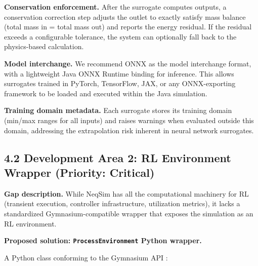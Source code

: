 \documentclass[review,3p]{custom}
\begin{document}
\textbf{Conservation enforcement.} After the surrogate computes outputs, a conservation correction step adjusts the outlet to exactly satisfy mass balance (total mass in = total mass out) and reports the energy residual. If the residual exceeds a configurable tolerance, the system can optionally fall back to the physics-based calculation.

\textbf{Model interchange.} We recommend ONNX \cite{ONNX2019} as the model interchange format, with a lightweight Java ONNX Runtime binding for inference. This allows surrogates trained in PyTorch, TensorFlow, JAX, or any ONNX-exporting framework to be loaded and executed within the Java simulation.

\textbf{Training domain metadata.} Each surrogate stores its training domain (min/max ranges for all inputs) and raises warnings when evaluated outside this domain, addressing the extrapolation risk inherent in neural network surrogates.

\subsection{4.2 Development Area 2: RL Environment Wrapper (Priority: Critical)}

\textbf{Gap description.} While NeqSim has all the computational machinery for RL (transient execution, controller infrastructure, utilization metrics), it lacks a standardized Gymnasium-compatible wrapper that exposes the simulation as an RL environment.

\textbf{Proposed solution: \texttt{ProcessEnvironment} Python wrapper.}

A Python class conforming to the Gymnasium API \cite{Towers2023}:
\end{document}
